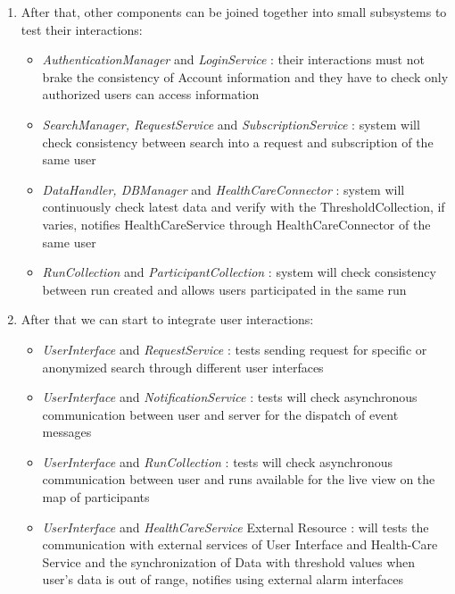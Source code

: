 \documentclass[a4paper, hidelinks, 12pt]{report}
\begin{document}
\begin{enumerate}
\item{} After that, other components can be joined together into small subsystems to test their interactions:
\begin{itemize}
\item{} \textit{AuthenticationManager} and \textit{LoginService} : their interactions must not brake the consistency of Account information and they have to check only authorized users can access information
\item{} \textit{SearchManager, RequestService} and \textit{SubscriptionService} : system will check consistency between search into a request and subscription of the same user
\item{} \textit{DataHandler, DBManager} and \textit{HealthCareConnector} : system will continuously check latest data and verify with the ThresholdCollection, if varies, notifies HealthCareService through HealthCareConnector of the same user
\item{} \textit{RunCollection} and \textit{ParticipantCollection} : system will check consistency between run created and allows users participated in the same run
\end{itemize}

\item{} After that we can start to integrate user interactions:
\begin{itemize}
\item{} \textit{UserInterface} and \textit{RequestService} : tests sending request for specific or anonymized search through different user interfaces
\item{} \textit{UserInterface} and \textit{NotificationService} : tests will check asynchronous communication between user and server for the dispatch of event messages
\item{} \textit{UserInterface} and \textit{RunCollection} : tests will check asynchronous communication between user and runs available for the live view on the map of participants
\item{} \textit{UserInterface} and \textit{HealthCareService} External Resource : will tests the communication
with external services of User Interface and Health-Care Service
and the synchronization of Data with threshold values when user's data is out of range, notifies using external alarm interfaces
\end{itemize}
\end{enumerate}
	
\end{document}
